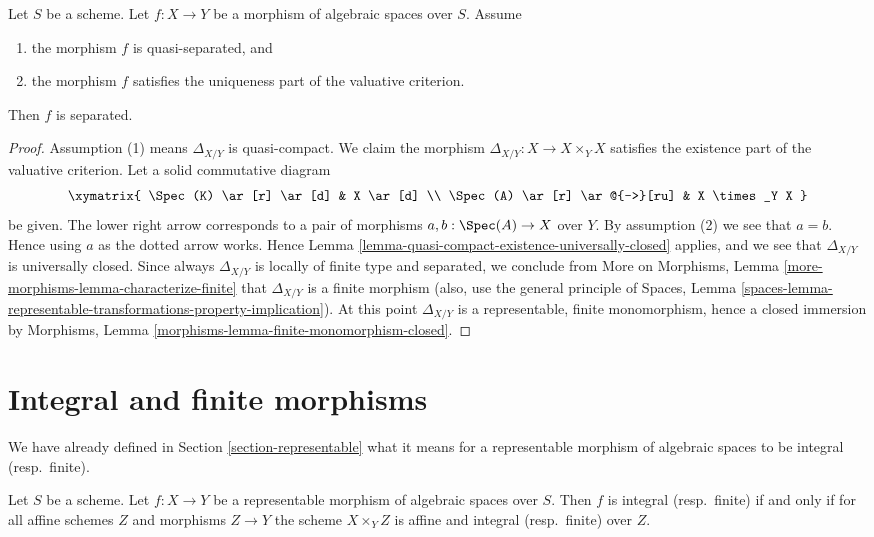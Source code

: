 \begin{lemma}
\label{lemma-valuative-criterion-separatedness}
Let $S$ be a scheme.
Let $f : X \to Y$ be a morphism of algebraic spaces over $S$.
Assume
\begin{enumerate}
\item the morphism $f$ is quasi-separated, and
\item the morphism $f$ satisfies the uniqueness
part of the valuative criterion.
\end{enumerate}
Then $f$ is separated.
\end{lemma}

\begin{proof}
Assumption (1) means $\Delta_{X/Y}$ is quasi-compact.
We claim the morphism
$\Delta_{X/Y} : X \to X \times_Y X$ satisfies the existence
part of the valuative criterion.
Let a solid commutative diagram
$$
\xymatrix{
\Spec(K) \ar[r] \ar[d] & X \ar[d] \\
\Spec(A) \ar[r] \ar@{-->}[ru] & X \times_Y X
}
$$
be given. The lower right arrow corresponds to a
pair of morphisms $a, b : \Spec(A) \to X$ over $Y$.
By assumption (2) we see that $a = b$. Hence using $a$ as the dotted
arrow works. Hence
Lemma \ref{lemma-quasi-compact-existence-universally-closed}
applies, and we see that $\Delta_{X/Y}$ is universally closed.
Since always $\Delta_{X/Y}$ is locally of finite type and
separated, we conclude from
More on Morphisms, Lemma \ref{more-morphisms-lemma-characterize-finite}
that $\Delta_{X/Y}$ is a finite morphism (also, use the
general principle of
Spaces, Lemma
\ref{spaces-lemma-representable-transformations-property-implication}).
At this point $\Delta_{X/Y}$ is a representable, finite monomorphism,
hence a closed immersion by
Morphisms, Lemma \ref{morphisms-lemma-finite-monomorphism-closed}.
\end{proof}







\section{Integral and finite morphisms}
\label{section-integral}

\noindent
We have already defined in Section \ref{section-representable}
what it means for a representable morphism of algebraic spaces
to be integral (resp.\ finite).

\begin{lemma}
\label{lemma-integral-representable}
Let $S$ be a scheme. Let $f : X \to Y$ be a representable
morphism of algebraic spaces over $S$. Then
$f$ is integral (resp.\ finite) if and only if for all affine schemes $Z$
and morphisms $Z \to Y$ the scheme $X \times_Y Z$ is affine and
integral (resp.\ finite) over $Z$.
\end{lemma}

